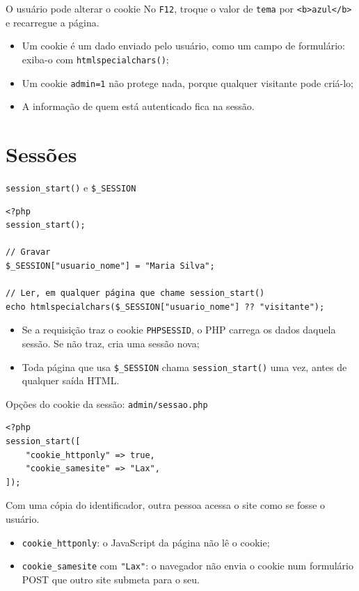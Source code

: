 \documentclass{beamer}
\begin{document}
\begin{frame}{O usuário pode alterar o cookie}
	No \texttt{F12}, troque o valor de \texttt{tema} por
	\texttt{<b>azul</b>} e recarregue a página.

	\vspace{0.3cm}
	\begin{itemize}
		\item Um cookie é um dado enviado pelo usuário, como um campo de
		      formulário: exiba-o com \texttt{htmlspecialchars()};
		\item Um cookie \texttt{admin=1} não protege nada, porque qualquer
		      visitante pode criá-lo;
		\item A informação de quem está autenticado fica na sessão.
	\end{itemize}
\end{frame}

\section{Sessões}

\begin{frame}[fragile]{\texttt{session\_start()} e \texttt{\$\_SESSION}}
	\begin{verbatim}
<?php
session_start();

// Gravar
$_SESSION["usuario_nome"] = "Maria Silva";

// Ler, em qualquer página que chame session_start()
echo htmlspecialchars($_SESSION["usuario_nome"] ?? "visitante");
	\end{verbatim}

	\begin{itemize}
		\item Se a requisição traz o cookie \texttt{PHPSESSID}, o PHP carrega os
		      dados daquela sessão. Se não traz, cria uma sessão nova;
		\item Toda página que usa \texttt{\$\_SESSION} chama
		      \texttt{session\_start()} uma vez, antes de qualquer saída HTML.
	\end{itemize}
\end{frame}

\begin{frame}[fragile]{Opções do cookie da sessão: \texttt{admin/sessao.php}}
	\begin{verbatim}
<?php
session_start([
    "cookie_httponly" => true,
    "cookie_samesite" => "Lax",
]);
	\end{verbatim}

	Com uma cópia do identificador, outra pessoa acessa o site como se fosse o
	usuário.

	\begin{itemize}
		\item \texttt{cookie\_httponly}: o JavaScript da página não lê o cookie;
		\item \texttt{cookie\_samesite} com \texttt{"Lax"}: o navegador não envia
		      o cookie num formulário POST que outro site submeta para o seu.
	\end{itemize}
\end{frame}
\end{document}
